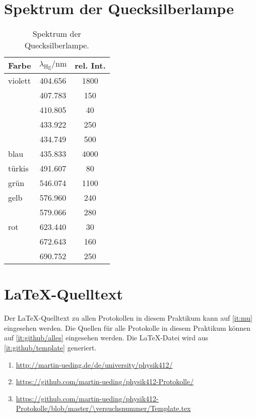\begin{appendix}
    \section{Spektrum der Quecksilberlampe}
    \label{sec:spektrum}

    \begin{table}[htbp]
        \centering
        \begin{tabular}{lSS}
            Farbe & {$\lambda_\text{Hg} / \si{\nano\meter}$} & {rel. Int.} \\
            \hline
            violett & 404.656 & 1800 \\
                    & 407.783 & 150 \\
                    & 410.805 & 40 \\
                    & 433.922 & 250 \\
                    & 434.749 & 500 \\
            blau & 435.833 & 4000 \\
            türkis & 491.607 & 80 \\
            grün & 546.074 & 1100 \\
            gelb & 576.960 & 240 \\
                 & 579.066 & 280 \\
            rot & 623.440 & 30 \\
                & 672.643 & 160 \\
                & 690.752 & 250
        \end{tabular}
        \caption{%
            Spektrum der Quecksilberlampe.
            \cite[P402.6.1]{physik412-Anleitung}
        }
        \label{tab:messdaten:gitterkonstante}
    \end{table}

    \FloatBarrier
    \section{\LaTeX-Quelltext}

    Der \LaTeX-Quelltext zu allen Protokollen in diesem Praktikum kann auf
    \ref{it:mu} eingesehen werden. Die Quellen für alle Protokolle in diesem
    Praktikum können auf \ref{it:github/alles} eingesehen werden. Die
    \LaTeX-Datei wird aus \ref{it:github/template} generiert.

    \begin{enumerate}
        \item
            \label{it:mu}
            \url{http://martin-ueding.de/de/university/physik412/}
        \item
            \label{it:github/alles}
            \url{https://github.com/martin-ueding/physik412-Protokolle/}
        \item
            \label{it:github/template}
            \url{https://github.com/martin-ueding/physik412-Protokolle/blob/master/\versuchsnummer/Template.tex}
    \end{enumerate}
\end{appendix}

